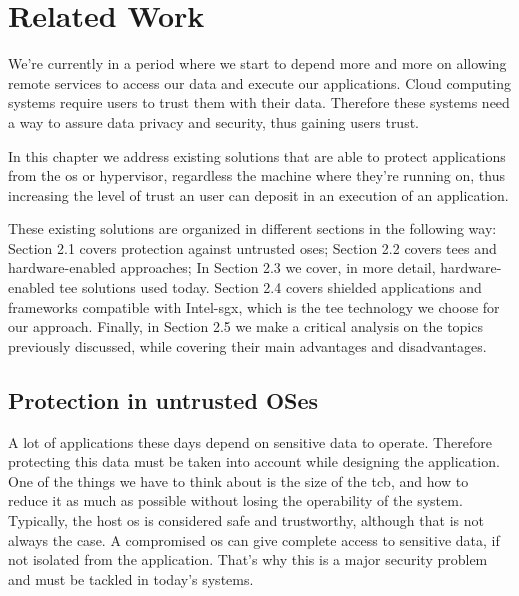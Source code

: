 \chapter{Related Work}
\label{cha:related_work}

We’re currently in a period where we start to depend more and more on allowing remote services to access our data and execute our applications. Cloud computing systems require users to trust them with their data. Therefore these systems need a way to assure data privacy
and security, thus gaining users trust.

In this chapter we address existing solutions that are able to protect applications from the \gls{os} or hypervisor, regardless the machine where they're running on, thus increasing the level of trust an user can deposit in an execution of an application.

These existing solutions are organized in different sections in the following way: 
Section 2.1 covers protection against untrusted \gls{os}es; 
Section 2.2 covers \gls{tee}s and hardware-enabled approaches;
In Section 2.3 we cover, in more detail, hardware-enabled \gls{tee} solutions used today.
Section 2.4 covers shielded applications and frameworks compatible with Intel-\gls{sgx}, which is the \gls{tee} technology we choose for our approach.
Finally, in Section 2.5 we make a critical analysis on the topics previously discussed, while covering their main advantages and disadvantages.




\section{Protection in untrusted OSes}
\label{sec:protect_untrustOS}

A lot of applications these days depend on sensitive data to operate. Therefore protecting this data must be taken into account while designing the application. 
One of the things we have to think about is the size of the \gls{tcb}, and how to reduce it as much as possible without losing the operability of the system. 
Typically, the host \gls{os} is considered safe and trustworthy, although that is not always the case. A compromised \gls{os} can give complete access to sensitive data, if not isolated from the application. That’s why this is a major security problem and must be tackled in today’s systems.

